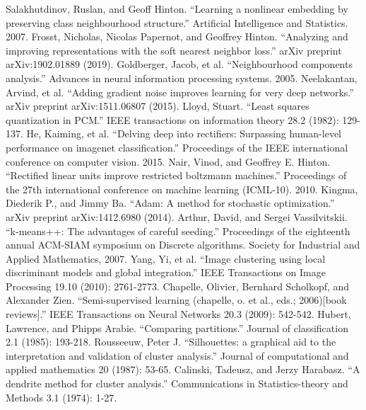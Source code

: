 \documentclass[conference]{IEEEtran}
\begin{document}
\begin{thebibliography}{00}
 Salakhutdinov, Ruslan, and Geoff Hinton. ``Learning a nonlinear embedding by preserving class neighbourhood structure.'' Artificial Intelligence and Statistics. 2007.
 Frosst, Nicholas, Nicolas Papernot, and Geoffrey Hinton. ``Analyzing and improving representations with the soft nearest neighbor loss.'' arXiv preprint arXiv:1902.01889 (2019).
 Goldberger, Jacob, et al. ``Neighbourhood components analysis.'' Advances in neural information processing systems. 2005.
 Neelakantan, Arvind, et al. ``Adding gradient noise improves learning for very deep networks.'' arXiv preprint arXiv:1511.06807 (2015).
 Lloyd, Stuart. ``Least squares quantization in PCM.'' IEEE transactions on information theory 28.2 (1982): 129-137.
 He, Kaiming, et al. ``Delving deep into rectifiers: Surpassing human-level performance on imagenet classification.'' Proceedings of the IEEE international conference on computer vision. 2015.
 Nair, Vinod, and Geoffrey E. Hinton. ``Rectified linear units improve restricted boltzmann machines.'' Proceedings of the 27th international conference on machine learning (ICML-10). 2010.
 Kingma, Diederik P., and Jimmy Ba. ``Adam: A method for stochastic optimization.'' arXiv preprint arXiv:1412.6980 (2014).
 Arthur, David, and Sergei Vassilvitskii. ``k-means++: The advantages of careful seeding.'' Proceedings of the eighteenth annual ACM-SIAM symposium on Discrete algorithms. Society for Industrial and Applied Mathematics, 2007.
 Yang, Yi, et al. ``Image clustering using local discriminant models and global integration.'' IEEE Transactions on Image Processing 19.10 (2010): 2761-2773.
 Chapelle, Olivier, Bernhard Scholkopf, and Alexander Zien. ``Semi-supervised learning (chapelle, o. et al., eds.; 2006)[book reviews].'' IEEE Transactions on Neural Networks 20.3 (2009): 542-542.
 Hubert, Lawrence, and Phipps Arabie. ``Comparing partitions.'' Journal of classification 2.1 (1985): 193-218.
 Rousseeuw, Peter J. ``Silhouettes: a graphical aid to the interpretation and validation of cluster analysis.'' Journal of computational and applied mathematics 20 (1987): 53-65.
 Calinski, Tadeusz, and Jerzy Harabasz. ``A dendrite method for cluster analysis.'' Communications in Statistics-theory and Methods 3.1 (1974): 1-27.

\end{thebibliography}
\end{document}

